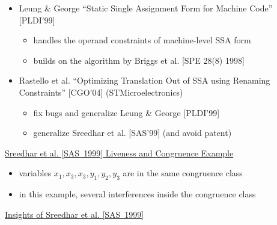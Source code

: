 \begin{itemize}
\item Leung \& George ``Static Single Assignment Form for Machine Code'' [PLDI'99]

\begin{itemize}
\item handles the operand constraints of machine-level SSA form
\item builds on the algorithm by Briggs et al. [SPE 28(8) 1998]
\end{itemize}

\item Rastello et al. ``Optimizing Translation Out of SSA using Renaming
Constraints'' [CGO'04] (STMicroelectronics)
\begin{itemize}
\item fix bugs and generalize Leung \& George [PLDI'99]
\item generalize Sreedhar et al. [SAS'99] (and avoid patent)
\end{itemize}

\end{itemize}


\begin{center} \underline{Sreedhar et al. [SAS~1999] Liveness and Congruence Example}
\end{center}

%

\begin{itemize}

\item variables ${x_1, x_3, x_3, y_1, y_2, y_3}$ are in the same congruence class

\item in this example, several interferences inside the congruence class

\end{itemize}


\begin{center} \underline{Insights of Sreedhar et al. [SAS~1999]}
\end{center}

